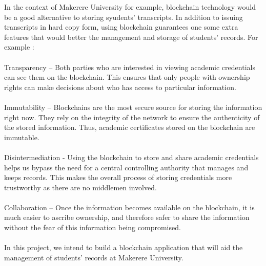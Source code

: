 In the context of Makerere University for example, blockchain technology would be a good alternative to storing syudents' transcripts. In addition to issuing transcripts in hard copy form, using blockchain guarantees one some extra features that would better the management and storage of students' records. For example \cite{art2} :\\\\
Transparency – Both parties who are interested in viewing academic credentials can see them on the  blockchain. This ensures that only people with ownership rights can make decisions about who has access to particular information.\\\\
Immutability – Blockchains are the most secure source for storing the information right now. They rely on the integrity of the network to ensure the authenticity of the stored information. Thus, academic certificates stored on the blockchain are immutable.\\\\
Disintermediation - Using the blockchain to store and share academic credentials helps us bypass the need for a central controlling authority that manages and keeps records. This makes the overall process of storing credentials more trustworthy as there are no middlemen involved.\\\\
Collaboration – Once the information becomes available on the blockchain, it is much easier to ascribe ownership, and therefore safer to share the information without the fear of this information being compromised.\\\\
In this project, we intend to build a blockchain application that will aid the management of students' records at Makerere University. 




